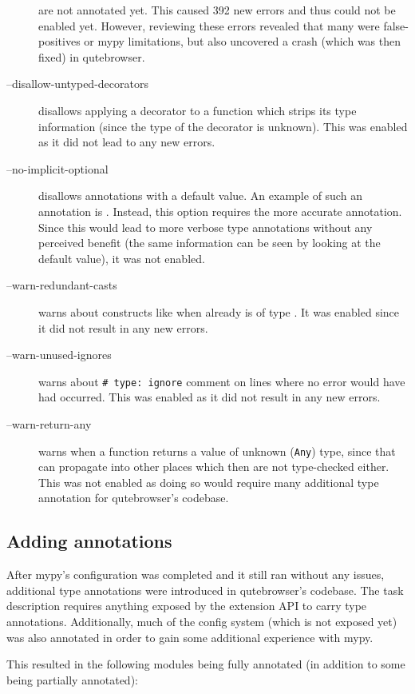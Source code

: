 \begin{description}
    are not annotated yet. This caused 392 new errors and thus could not be
    enabled yet. However, reviewing these errors revealed that many were
    false-positives or mypy limitations, but also uncovered a crash (which was
    then fixed) in qutebrowser.
  \item[--disallow-untyped-decorators] disallows applying a decorator to a
    function which strips its type information (since the type of the decorator
    is unknown). This was enabled as it did not lead to any new errors.
  \item[--no-implicit-optional] disallows annotations with a  default
    value. An example of such an annotation is .
    Instead, this option requires the more accurate 
    annotation. Since this would lead to more verbose type annotations without any
    perceived benefit (the same information can be seen by looking at the default
    value), it was not enabled.
  \item[--warn-redundant-casts] warns about constructs like  when  already is of type . It was enabled since it
    did not result in any new errors.
  \item[--warn-unused-ignores] warns about \texttt{# type: ignore}
    comment on lines where no error would have had occurred. This was enabled as
    it did not result in any new errors.
  \item[--warn-return-any] warns when a function returns a value of unknown
    (\verb|Any|) type, since that can propagate into other places which then are
    not type-checked either. This was not enabled as doing so would require many
    additional type annotation for qutebrowser's codebase.
\end{description}

\subsection{Adding annotations}

After mypy's configuration was completed and it still ran without any issues,
additional type annotations were introduced in qutebrowser's codebase. The task
description requires anything exposed by the extension API to carry type
annotations. Additionally, much of the config system (which is not exposed yet)
was also annotated in order to gain some additional experience with mypy.

This resulted in the following modules being fully annotated (in addition to
some being partially annotated):


